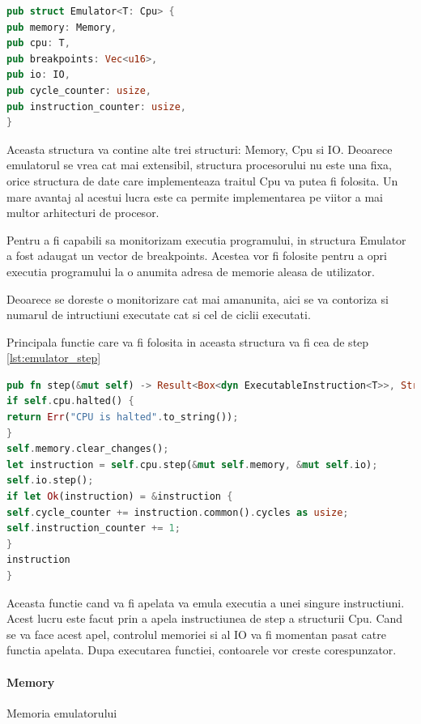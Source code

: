 \documentclass[titlepage,12pt]{article}
\DeclareRobustCommand{\code}[1]{{\ttfamily\small #1}}
\begin{document}
\begin{lstlisting}[language=Rust,caption={Structura Emulator},label={lst:emulator_struct}]
pub struct Emulator<T: Cpu> {
pub memory: Memory,
pub cpu: T,
pub breakpoints: Vec<u16>,
pub io: IO,
pub cycle_counter: usize,
pub instruction_counter: usize,
}
\end{lstlisting}

Aceasta structura va contine alte trei structuri: \code{Memory}, \code{Cpu} si \code{IO}. Deoarece emulatorul se vrea cat mai extensibil, structura procesorului nu este una fixa, orice structura de date care implementeaza traitul \code{Cpu} va putea fi folosita. Un mare avantaj al acestui lucra este ca permite implementarea pe viitor a mai multor arhitecturi de procesor.

Pentru a fi capabili sa monitorizam executia programului, in structura \code{Emulator} a fost adaugat un vector de breakpoints. Acestea vor fi folosite pentru a opri executia programului la o anumita adresa de memorie aleasa de utilizator.

Deoarece se doreste o monitorizare cat mai amanunita, aici se va contoriza si numarul de intructiuni executate cat si cel de ciclii executati.

Principala functie care va fi folosita in aceasta structura va fi cea de step \cref{lst:emulator_step}

\begin{lstlisting}[language=Rust,caption={Functia step a emulatorului},label={lst:emulator_step}]
pub fn step(&mut self) -> Result<Box<dyn ExecutableInstruction<T>>, String> {
if self.cpu.halted() {
return Err("CPU is halted".to_string());
}
self.memory.clear_changes();
let instruction = self.cpu.step(&mut self.memory, &mut self.io);
self.io.step();
if let Ok(instruction) = &instruction {
self.cycle_counter += instruction.common().cycles as usize;
self.instruction_counter += 1;
}
instruction
}
\end{lstlisting}
Aceasta functie cand va fi apelata va emula executia a unei singure instructiuni. Acest lucru este facut prin a apela instructiunea de step a structurii \code{Cpu}. Cand se va face acest apel, controlul memoriei si al \code{IO} va fi momentan pasat catre functia apelata. Dupa executarea functiei, contoarele vor creste corespunzator.

\paragraph{\code{Memory}} Memoria emulatorului
\end{document}
